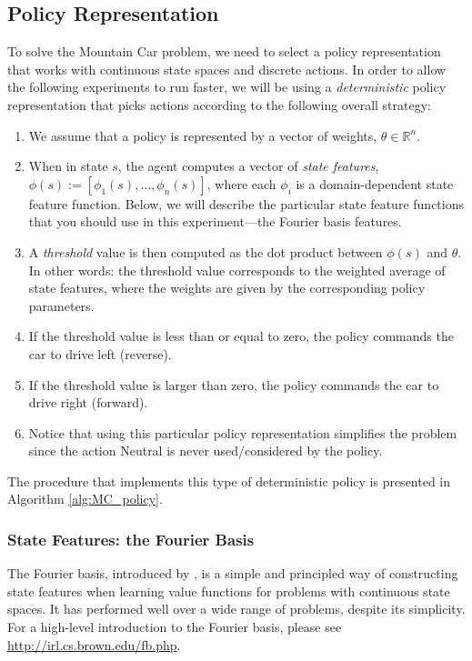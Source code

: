 \documentclass{article}
\begin{document}
\subsection{Policy Representation}

To solve the Mountain Car problem, we need to select a policy representation that works with continuous state spaces and discrete actions. In order to allow the following experiments to run faster, we will be using a \textit{deterministic} policy representation that picks actions according to the following overall strategy:
\begin{enumerate}
    \item We assume that a policy is represented by a vector of weights, $\theta \in \mathbb{R}^n$.
    \item When in state $s$, the agent computes a vector of \textit{state features}, $\phi(s) := [\phi_1(s), \ldots, \phi_n(s)]$, where each $\phi_i$ is a domain-dependent state feature function. Below, we will describe the particular state feature functions that you should use in this experiment---the Fourier basis features.
    \item A \textit{threshold} value is then computed as the dot product between $\phi(s)$ and $\theta$. In other words: the threshold value corresponds to the weighted average of state features, where the weights are given by the corresponding policy parameters.
    \item If the threshold value is less than or equal to zero, the policy commands the car to drive left (reverse).
    \item If the threshold value is larger than zero, the policy commands the car to drive right (forward).
    \item Notice that using this particular policy representation simplifies the problem since the action Neutral is never used/considered by the policy.
\end{enumerate}
%
The procedure that implements this type of deterministic policy is presented in Algorithm \ref{alg:MC_policy}.
%
\vspace{0.2in}
%
\subsubsection{State Features: the Fourier Basis}
\label{sec:FB}
\vspace{0.2in}

The Fourier basis, introduced by  \citet{Konidaris2011}, is a simple and principled way of constructing state features when learning value functions for problems with continuous state spaces. It has performed well over a wide range of problems, despite its simplicity. For a high-level introduction to the Fourier basis, please see \url{http://irl.cs.brown.edu/fb.php}. 
\end{document}
